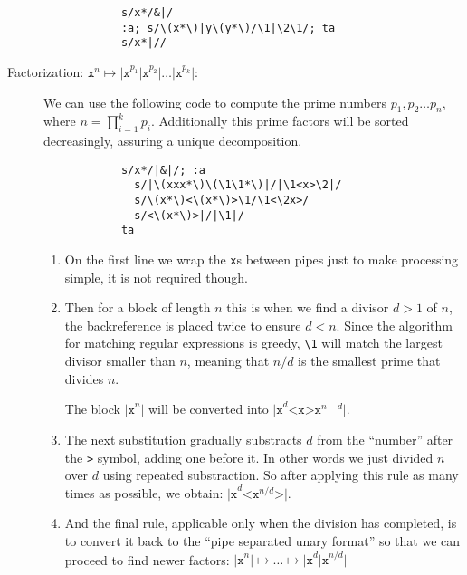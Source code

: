 \begin{description}
		\begin{Verbatim}
			s/x*/&|/
			:a; s/\(x*\)|y\(y*\)/\1|\2\1/; ta
			s/x*|//
		\end{Verbatim}

	\item[Factorization: $\texttt{x}^n \mapsto
		\texttt{|x}^{p_1}\texttt{|x}^{p_2}\texttt{|}
		\ldots\texttt{|x}^{p_k}\texttt{|}$:]

		We can use the following code to compute the prime numbers
		$p_1, p_2\ldots p_n$, where $n=\prod_{i=1}^k p_i$.
		Additionally this prime factors will be sorted
		decreasingly, assuring a unique decomposition.

		\begin{Verbatim}
			s/x*/|&|/; :a
			  s/|\(xxx*\)\(\1\1*\)|/|\1<x>\2|/
			  s/\(x*\)<\(x*\)>\1/\1<\2x>/
			  s/<\(x*\)>|/|\1|/
			ta
		\end{Verbatim}

		\begin{enumerate}
			\item On the first line we wrap the {\tt x}s between pipes just to
				make processing simple, it is not required though.

			\item Then for a block of length $n$ this is when we find a 
				divisor $d>1$ of $n$, the backreference is placed twice to ensure
				$d<n$.  Since the algorithm for matching regular expressions is
				greedy, \verb|\1| will match the largest divisor smaller than $n$,
				meaning that $n/d$ is the smallest prime that divides $n$.

				The block $\texttt{|x}^n\texttt{|}$ will be converted into
				$\texttt{|x}^d\texttt{<x>x}^{n-d}\texttt{|}$.

			\item The next substitution gradually substracts $d$ from the
				``number'' after the \verb|>| symbol, adding one before it.
				In other words we just divided $n$ over $d$ using repeated
				substraction.
				So after applying this rule as many times as possible, we obtain:
				$\texttt{|x}^d\texttt{<x}^{n/d}\texttt{>|}$.

			\item And the final rule, applicable only when the division has
				completed, is to convert it back to the ``pipe separated
				unary format'' so that we can proceed to find newer factors:
				$ \texttt{|x}^n\texttt{|} \mapsto \ldots
				\mapsto \texttt{|x}^d\texttt{|x}^{n/d}\texttt{|}$
		\end{enumerate}


\end{description}
